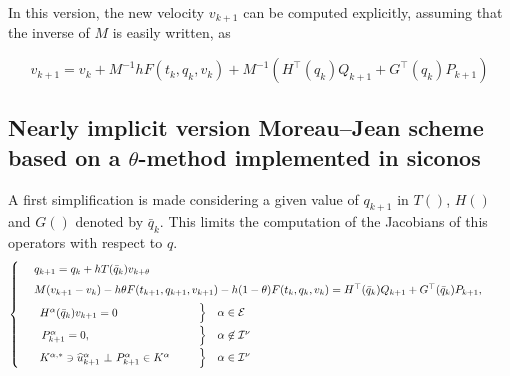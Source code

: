In this version, the new velocity $v_{k+1}$ can be computed explicitly, assuming that the inverse of $M$ is easily written, as

\begin{equation}
  \label{eq:Moreau--Jean-theta--explicit-v}
  v_{k+1}   =  v_k + M^{-1} h  F(t_{k}, q_{k},v_{k}) +  M^{-1} (H^\top(q_{k}) Q_{k+1}+  G^\top(q_{k}) P_{k+1})
\end{equation}


\subsection{Nearly implicit version Moreau--Jean scheme based on a  $\theta$-method implemented in siconos}

A first simplification is made considering a given value of $q_{k+1}$ in $T()$, $H()$ and $G()$ denoted by $\bar q_k$. This limits the computation of the Jacobians of this operators with respect to $q$. 
\begin{equation}
    \label{eq:Moreau--Jean-theta-nearly}
    \begin{cases}
      ~~\begin{array}{l}
        q_{k+1} = q_{k} + h T(\bar q_k) v_{k+\theta} \quad \\[1ex]
        M(v_{k+1}-v_k) - h  \theta F(t_{k+1}, q_{k+1},v_{k+1}) - h (1- \theta) F(t_{k}, q_{k},v_{k})  =  H^\top(\bar q_k) Q_{k+1} + G^\top(\bar q_k) P_{k+1},\quad\,\\[1ex]
      \end{array}\\
      ~~\begin{array}{lcl}
        \begin{array}{l}
          H^\alpha(\bar q_k) v_{k+1}  =  0\\
        \end{array} & \left. \begin{array}{l}
          \vphantom{H^\alpha(q_{k+1}) v_{k+1}  =  0}\\[1ex]
        \end{array}\right\}    &\alpha \in \mathcal E  \\[1ex]
      ~~P_{k+1}^\alpha= 0, &
      \left. \begin{array}{l}
          \vphantom{P_{k+1}^\alpha= 0,  \delta^\alpha_{k+1}=0}\\[1ex]
        \end{array}\right\}   & \alpha \not\in \mathcal I^\nu \\[1ex]
      \begin{array}{l}
          {K}^{\alpha,*} \ni \widehat u_{k+1}^\alpha~ \bot~ P_{k+1}^\alpha \in {K}^\alpha \\
      \end{array} &
      \left.\begin{array}{l}
          \vphantom{{K}^{\alpha,*} \ni \widehat u_{k+1}^\alpha~ \bot~ P_{k+1}^\alpha \in {K}^\alpha} \\
        \end{array}\right\}
      &\alpha \in \mathcal I^\nu\\
  \end{array}
\end{cases}
\end{equation}
